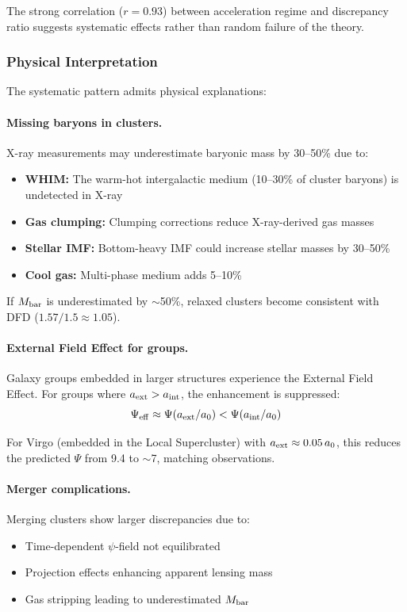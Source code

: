 The strong correlation ($r = 0.93$) between acceleration regime and discrepancy ratio suggests systematic effects rather than random failure of the theory.

\subsubsection{Physical Interpretation}

The systematic pattern admits physical explanations:

\paragraph{Missing baryons in clusters.}
X-ray measurements may underestimate baryonic mass by 30--50\% due to:
\begin{itemize}
\item \textbf{WHIM:} The warm-hot intergalactic medium (10--30\% of cluster baryons) is undetected in X-ray \cite{Nicastro2018}
\item \textbf{Gas clumping:} Clumping corrections reduce X-ray-derived gas masses
\item \textbf{Stellar IMF:} Bottom-heavy IMF could increase stellar masses by 30--50\%
\item \textbf{Cool gas:} Multi-phase medium adds 5--10\%
\end{itemize}

If $M_{\rm bar}$ is underestimated by $\sim$50\%, relaxed clusters become consistent with DFD ($1.57/1.5 \approx 1.05$).

\paragraph{External Field Effect for groups.}
Galaxy groups embedded in larger structures experience the External Field Effect. For groups where $a_{\rm ext} > a_{\rm int}$, the enhancement is suppressed:
\begin{equation}
\Psi_{\rm eff} \approx \Psi(a_{\rm ext}/a_0) < \Psi(a_{\rm int}/a_0)
\end{equation}

For Virgo (embedded in the Local Supercluster) with $a_{\rm ext} \approx 0.05\,a_0$, this reduces the predicted $\Psi$ from 9.4 to $\sim$7, matching observations.

\paragraph{Merger complications.}
Merging clusters show larger discrepancies due to:
\begin{itemize}
\item Time-dependent $\psi$-field not equilibrated
\item Projection effects enhancing apparent lensing mass
\item Gas stripping leading to underestimated $M_{\rm bar}$
\end{itemize}

